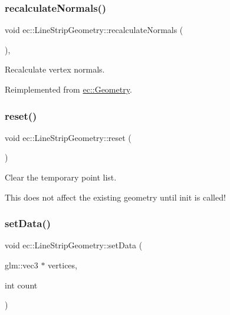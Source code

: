 \subsubsection{\texorpdfstring{recalculate\+Normals()}{recalculateNormals()}}
{\footnotesize\ttfamily void ec\+::\+Line\+Strip\+Geometry\+::recalculate\+Normals (\begin{DoxyParamCaption}{ }\end{DoxyParamCaption})\hspace{0.3cm}{\ttfamily [override]}, {\ttfamily [virtual]}}



Recalculate vertex normals. 



Reimplemented from \mbox{\hyperlink{classec_1_1_geometry_a228d4a0fa01a17379f24aee2c769b501}{ec\+::\+Geometry}}.

\mbox{\label{classec_1_1_line_strip_geometry_abaf125f40af2b979e4b3af3939bb0a0e}} 
\subsubsection{\texorpdfstring{reset()}{reset()}}
{\footnotesize\ttfamily void ec\+::\+Line\+Strip\+Geometry\+::reset (\begin{DoxyParamCaption}{ }\end{DoxyParamCaption})}



Clear the temporary point list. 

This does not affect the existing geometry until init is called! \mbox{\label{classec_1_1_line_strip_geometry_a2649268027055ff190efb0efdc5768a4}} 
\subsubsection{\texorpdfstring{set\+Data()}{setData()}}
{\footnotesize\ttfamily void ec\+::\+Line\+Strip\+Geometry\+::set\+Data (\begin{DoxyParamCaption}\item[{glm\+::vec3 $\ast$}]{vertices,  }\item[{int}]{count }\end{DoxyParamCaption})}



